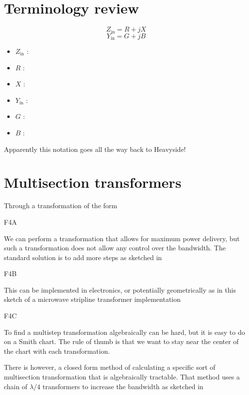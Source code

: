 
\section{Terminology review}

\begin{equation}\label{eqn:uwavesDeck7MultisectionTransformersCore:20}
Z_{\textrm{in}} = R + j X
\end{equation}
\begin{equation}\label{eqn:uwavesDeck7MultisectionTransformersCore:40}
Y_{\textrm{in}} = G + j B
\end{equation}

\begin{itemize}
\item \( Z_{\textrm{in}} \) : 
\item \( R \) : 
\item \( X \) : 
\item \( Y_{\textrm{in}} \) : 
\item \( G \) : 
\item \( B \) : 
\end{itemize}

Apparently this notation goes all the way back to Heavyside!

\section{Multisection transformers}

Through a transformation of the form

F4A

We can perform a transformation that allows for maximum power delivery, but such a transformation does not allow any control over the bandwidth.  The standard solution is to add more steps as sketched in

F4B

This can be implemented in electronics, or potentially geometrically as in this sketch of a microwave stripline transformer implementation

F4C

To find a multistep transformation algebraically can be hard, but it is easy to do on a Smith chart.  The rule of thumb is that we want to stay near the center of the chart with each transformation.

There is however, a closed form method of calculating a specific sort of multisection transformation that is algebraically tractable.  That method uses a chain of \( \lambda/4 \) transformers to increase the bandwidth as sketched in 

